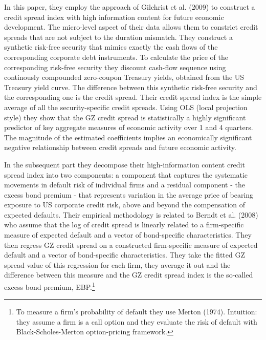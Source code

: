 \documentclass{article}
\begin{document}
{In this paper, they employ the approach of Gilchrist et al. (2009) to construct a credit spread index with high information content for future economic development. The micro-level aspect of their data allows them to constrict credit spreads that are not subject to the duration mismatch. They construct a synthetic risk-free security that mimics exactly the cash flows of the corresponding corporate debt instruments. To calculate the price of the corresponding risk-free security they discount cash-flow sequence using continously compounded zero-coupon Treasury yields, obtained from the US Treasury yield curve. The difference between this synthetic risk-free security and the corresponding one is the credit spread. Their credit spread index is the simple average of all the security-specific credit spreads. Using OLS (local projection style) they show that the GZ credit spread is statistically a highly significant predictor of key aggregate measures of economic activity over 1 and 4 quarters. The magnitude of the estimated coefficients implies an economically significant negative relationship between credit spreads and future economic activity. 

In the subsequent part they decompose their high-information content credit spread index into two components: a component that captures the systematic movements in default risk of individual firms and a residual component - the excess bond premium - that represents variation in the average price of bearing exposure to US corporate credit risk, above and beyond the compensation of expected defaults. Their empirical methodology is related to Berndt et al. (2008) who assume that the log of credit spread is linearly related to a firm-specific measure of expected default and a vector of bond-specific characteristics. They then regress GZ credit spread on a constructed firm-specific measure of expected default and a vector of bond-specific characteristics. They take the fitted GZ spread value of this regression for each firm, they average it out and the difference between this measure and the GZ credit spread index is the so-called excess bond premium, EBP.\footnote{To measure a firm's probability of default they use Merton (1974). Intuition: they assume a firm is a call option and they evaluate the risk of default with Black-Scholes-Merton option-pricing framework.}

}
\end{document}
